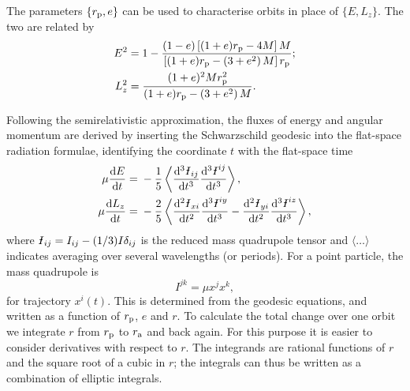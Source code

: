 The parameters $\{r_\mathrm{p},e\}$ can be used to characterise orbits in place of $\{E,L_z\}$. The two are related by
\begin{align}
E^2 = {} & 1 - \dfrac{(1 - e) \left[(1 + e)r_\mathrm{p} - 4M\right]M}{\left[(1 + e)r_\mathrm{p} - \left(3 + e^2\right)M\right]r_\mathrm{p}}; \\
L_z^2 = {} & \dfrac{(1 + e)^2 M r_\mathrm{p}^2}{(1 + e)r_\mathrm{p} - \left(3 + e^2\right)M}.
\end{align}

Following the semirelativistic approximation, the fluxes of energy and angular momentum are derived by inserting the Schwarzschild geodesic into the flat-space radiation formulae, identifying the coordinate $t$ with the flat-space time \citep[chapter 36]{Misner1973}
\begin{align}
\mu\diff{E}{t} = {} & -\recip{5}\left\langle \diffn{\Ibar_{ij}}{t}{3}\diffn{\Ibar^{ij}}{t}{3}\right\rangle,\\
\mu\diff{L_z}{t} = {} & -\dfrac{2}{5}\left\langle\diffn{\Ibar_{xi}}{t}{2}\diffn{\Ibar^{iy}}{t}{3} - \diffn{\Ibar_{yi}}{t}{2}\diffn{\Ibar^{iz}}{t}{3}\right\rangle,
\end{align}
where $\Ibar_{ij} = I_{ij} - (1/3)I\delta_{ij}$ is the reduced mass quadrupole tensor and $\langle\ldots\rangle$ indicates averaging over several wavelengths (or periods). For a point particle, the mass quadrupole is
\begin{equation}
{I}^{jk} = \mu x^j x^k,
\end{equation}
for trajectory $x^i(t)$. This is determined from the geodesic equations, and written as a function of $r_\mathrm{p}$, $e$ and $r$. To calculate the total change over one orbit we integrate $r$ from $r_\mathrm{p}$ to $r_\mathrm{a}$ and back again. For this purpose it is easier to consider derivatives with respect to $r$. The integrands are rational functions of $r$ and the square root of a cubic in $r$; the integrals can thus be written as a combination of elliptic integrals.

